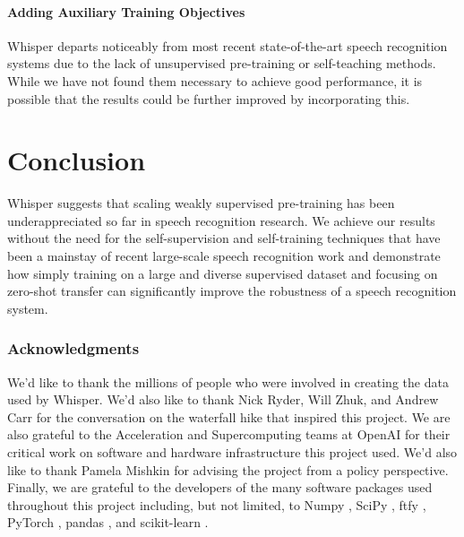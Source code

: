 \documentclass[nohyperref]{article}
\theoremstyle{plain}
\theoremstyle{definition}
\theoremstyle{remark}
\begin{document}
\paragraph{Adding Auxiliary Training Objectives} Whisper departs noticeably from most recent state-of-the-art speech recognition systems due to the lack of unsupervised pre-training or self-teaching methods. While we have not found them necessary to achieve good performance, it is possible that the results could be further improved by incorporating this.

\section{Conclusion}\label{sec:conclusion}

Whisper suggests that scaling weakly supervised pre-training has been underappreciated so far in speech recognition research. We achieve our results without the need for the self-supervision and self-training techniques that have been a mainstay of recent large-scale speech recognition work and demonstrate how simply training on a large and diverse supervised dataset and focusing on zero-shot transfer can significantly improve the robustness of a speech recognition system.

\subsubsection*{Acknowledgments}
We'd like to thank the millions of people who were involved in creating the data used by Whisper. We'd also like to thank Nick Ryder, Will Zhuk, and Andrew Carr for the conversation on the waterfall hike that inspired this project. We are also grateful to the Acceleration and Supercomputing teams at OpenAI for their critical work on software and hardware infrastructure this project used. We'd also like to thank Pamela Mishkin for advising the project from a policy perspective. Finally, we are grateful to the developers of the many software packages used throughout this project including, but not limited, to Numpy \citep{2020NumPy-Array}, SciPy \citep{2020SciPy-NMeth}, ftfy \citep{speer-2019-ftfy}, PyTorch \citep{NEURIPS2019_9015}, pandas \citep{reback2020pandas}, and scikit-learn \citep{scikit-learn}.





\newpage
\appendix
\onecolumn
\end{document}
